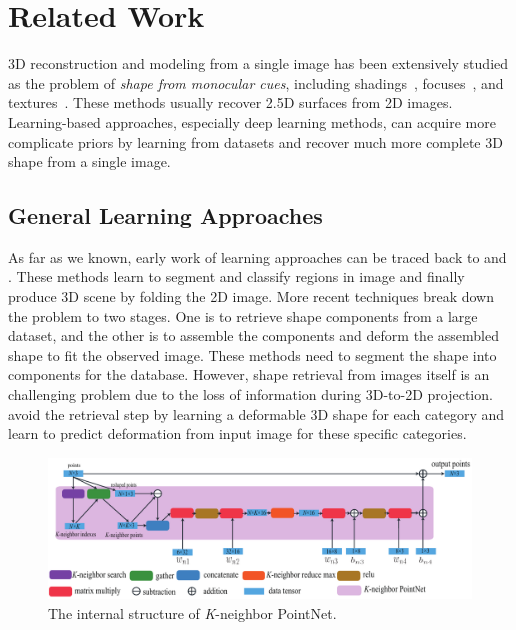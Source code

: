 \section{Related Work}
3D reconstruction and modeling from a single image has been extensively studied as the problem of \emph{shape from monocular cues}, including shadings~\cite{shapefromshadingsurvey}, focuses~\cite{shapefromdf1,shapefromdf2}, and textures~\cite{Aloimonos1988}. 
These methods usually recover 2.5D surfaces from 2D images. 
Learning-based approaches, especially deep learning methods, can acquire more complicate priors by learning from datasets and recover much more complete 3D shape from a single image.
 
\subsection{General Learning Approaches}
As far as we known, early work of learning approaches can be traced back to \cite{Hoiem2007} and \cite{learn3D2007}. These methods learn to segment and classify regions in image and finally produce 3D scene by folding the 2D image.
%
More recent techniques break down the problem to two stages\cite{Su:2014,jointimgshape}. One is to retrieve shape components from a large dataset, and the other is to assemble the components and deform the assembled shape to fit the observed image. These methods need to segment the shape into components for the database.
%
However, shape retrieval from images itself is an challenging problem due to the loss of information during 3D-to-2D projection. 
\cite{imgrecon15} avoid the retrieval step by learning a deformable 3D shape for each category and learn to predict deformation from input image for these specific categories.
%

\begin{figure}[htbp]
	\centering
	\includegraphics[width=\linewidth]{img/net/k-n_pointnet}
	\caption{The internal structure of \textit{K}-neighbor PointNet.}
	\label{fig:knpointnet}
\end{figure}



